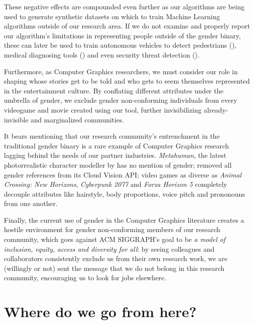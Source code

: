 \documentclass[nonacm,sigconf,review,balance=false]{acmart}
\begin{document}
These negative effects are compounded even further as our algorithms are being
used to generate synthetic datasets on which to train Machine Learning
algorithms outside of our research area. If we do not examine and properly
report our algorithm's limitations in representing people outside of the gender
binary, these can later be used to train autonomous vehicles to detect
pedestrians (\cite{cars}), medical diagnosing tools (\cite{chen2021synthetic})
and even security threat detection (\cite{dhs}).

Furthermore, as Computer Graphics researchers, we must consider our role in
shaping whose stories get to be told and who gets to seem themselves represented
in the entertainment culture. By conflating different attributes under the
umbrella of gender, we exclude gender non-conforming individuals from every
videogame and movie created using our tool, further invisibilizing
already-invisible and marginalized communities.

It bears mentioning that our research community's entrenchment in the
traditional gender binary is a rare example of Computer Graphics research
lagging behind the needs of our partner industries. \emph{Metahuman}, the latest
photorrealistic character modeller by \citet{metahuman} has no mention of
gender; \citet{googlegender} removed all gender references from its Cloud Vision
API; video games as diverse as \emph{Animal Crossing: New Horizons},
\emph{Cyberpunk 2077} and \emph{Forza Horizon 5} completely decouple attributes
like hairstyle, body proportions, voice pitch and prononouns from one another. 

Finally, the current use of gender in the Computer Graphics literature creates a
hostile environment for gender non-conforming members of our research community,
which goes against ACM SIGGRAPH's goal to be \emph{a model of inclusion, equity,
access and diversity for all}:  by seeing colleagues and collaborators
consistently exclude us  from their own research work, we are (willingly or not)
sent the message that we do not belong in this research community, encouraging
us to look for jobs elsewhere.

\section{Where do we go from here?}
\end{document}
